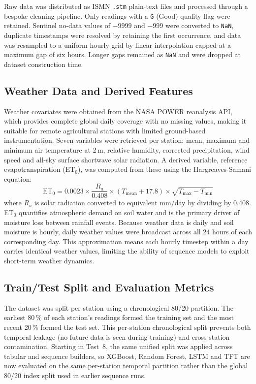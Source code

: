 \documentclass[12pt, a4paper]{article}
\begin{document}
Raw data was distributed as ISMN \texttt{.stm} plain-text files and processed
through a bespoke cleaning pipeline. Only readings with a \texttt{G} (Good)
quality flag were retained. Sentinel no-data values of $-9999$ and $-999$ were
converted to \texttt{NaN}, duplicate timestamps were resolved by retaining the
first occurrence, and data was resampled to a uniform hourly grid by linear
interpolation capped at a maximum gap of six hours. Longer gaps remained as
\texttt{NaN} and were dropped at dataset construction time.

\subsection{Weather Data and Derived Features}

Weather covariates were obtained from the NASA POWER reanalysis API, which
provides complete global daily coverage with no missing values, making it
suitable for remote agricultural stations with limited ground-based
instrumentation. Seven variables were retrieved per station: mean, maximum and
minimum air temperature at 2\,m, relative humidity, corrected precipitation,
wind speed and all-sky surface shortwave solar radiation. A derived variable,
reference evapotranspiration (ET$_0$), was computed from these using the
Hargreaves-Samani equation:
\begin{equation}
  \text{ET}_0 = 0.0023 \times \frac{R_a}{0.408} \times (T_{\text{mean}} + 17.8)
  \times \sqrt{T_{\max} - T_{\min}}
\end{equation}
where $R_a$ is solar radiation converted to equivalent mm/day by dividing by
0.408. ET$_0$ quantifies atmospheric demand on soil water and is the primary
driver of moisture loss between rainfall events. Because weather data is daily
and soil moisture is hourly, daily weather values were broadcast across all
24 hours of each corresponding day. This approximation means each hourly timestep
within a day carries identical weather values, limiting the ability of sequence
models to exploit short-term weather dynamics.

\subsection{Train/Test Split and Evaluation Metrics}

The dataset was split per station using a chronological 80/20 partition. The
earliest 80\,\% of each station's readings formed the training set and the most
recent 20\,\% formed the test set. This per-station chronological split prevents
both temporal leakage (no future data is seen during training) and cross-station
contamination. Starting in Test~8, the same unified split was applied across
tabular and sequence builders, so XGBoost, Random Forest, LSTM and TFT are now
evaluated on the same per-station temporal partition rather than the global
80/20 index split used in earlier sequence runs.
\end{document}
